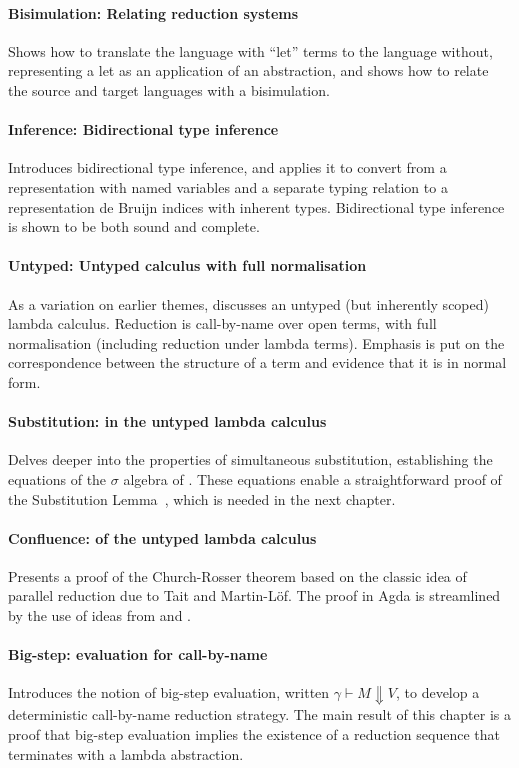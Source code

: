 \documentclass[preprint,authoryear]{elsarticle}
\begin{document}
\paragraph{Bisimulation: Relating reduction systems}
Shows how to translate the language with ``let'' terms
to the language without, representing a let as an application of an abstraction,
and shows how to relate the source and target languages with a bisimulation.

\paragraph{Inference: Bidirectional type inference}
Introduces bidirectional type inference, and applies it to convert from
a representation with named variables and a separate typing relation
to a representation de Bruijn indices with inherent types. Bidirectional
type inference is shown to be both sound and complete.

\paragraph{Untyped: Untyped calculus with full normalisation}
As a variation on earlier themes, discusses an untyped (but inherently
scoped) lambda calculus.  Reduction is call-by-name over open terms,
with full normalisation (including reduction under lambda terms).  Emphasis
is put on the correspondence between the structure of a term and
evidence that it is in normal form.

\paragraph{Substitution: in the untyped lambda calculus}
Delves deeper into the properties of simultaneous substitution,
establishing the equations of the $\sigma$ algebra of
\citet{Abadi-1991}. These equations enable a straightforward proof of
the Substitution Lemma~\citep{Barendregt-1984}, which is needed in the
next chapter.

\paragraph{Confluence: of the untyped lambda calculus}
Presents a proof of the Church-Rosser theorem based on the classic
idea of parallel reduction due to Tait and Martin-L\"of. The proof in
Agda is streamlined by the use of ideas from
\citet{Schafer-Tebbi-Smolka-2015} and \citet{Pfenning-1992}.

\paragraph{Big-step: evaluation for call-by-name}
Introduces the notion of big-step evaluation, written $\gamma \vdash M
\Downarrow V$, to develop a deterministic call-by-name reduction
strategy. The main result of this chapter is a proof that big-step
evaluation implies the existence of a reduction sequence that
terminates with a lambda abstraction.
\end{document}
